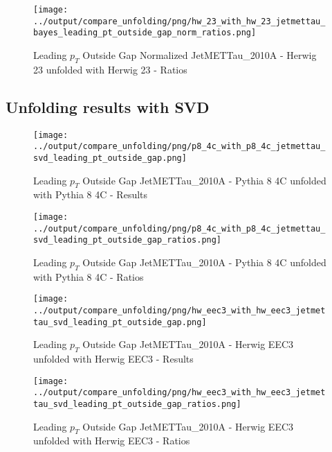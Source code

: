 \documentclass[11pt]{book}
\begin{document}
\begin{figure}[ht]
\centering
\texttt{[image: ../output/compare\_unfolding/png/hw\_23\_with\_hw\_23\_jetmettau\_bayes\_leading\_pt\_outside\_gap\_norm\_ratios.png]}
\caption{Leading $p_{T}$ Outside Gap Normalized JetMETTau\_2010A - Herwig 23 unfolded with Herwig 23 - Ratios}
\label{hw_23_hw_23_jetmettau_bayes_leading_pt_outside_gap_norm_b}
\end{figure}



\clearpage
\subsection{Unfolding results with SVD}

\begin{figure}[ht]
\centering
\texttt{[image: ../output/compare\_unfolding/png/p8\_4c\_with\_p8\_4c\_jetmettau\_svd\_leading\_pt\_outside\_gap.png]}
\caption{Leading $p_{T}$ Outside Gap JetMETTau\_2010A - Pythia 8 4C unfolded with Pythia 8 4C - Results}
\label{p8_p8_jetmettau_svd_leading_pt_outside_gap_a}
\end{figure}

\begin{figure}[ht]
\centering
\texttt{[image: ../output/compare\_unfolding/png/p8\_4c\_with\_p8\_4c\_jetmettau\_svd\_leading\_pt\_outside\_gap\_ratios.png]}
\caption{Leading $p_{T}$ Outside Gap JetMETTau\_2010A - Pythia 8 4C unfolded with Pythia 8 4C - Ratios}
\label{p8_p8_jetmettau_svd_leading_pt_outside_gap_b}
\end{figure}

\begin{figure}[ht]
\centering
\texttt{[image: ../output/compare\_unfolding/png/hw\_eec3\_with\_hw\_eec3\_jetmettau\_svd\_leading\_pt\_outside\_gap.png]}
\caption{Leading $p_{T}$ Outside Gap JetMETTau\_2010A - Herwig EEC3 unfolded with Herwig EEC3 - Results}
\label{hw_eec3_hw_eec3_jetmettau_svd_leading_pt_outside_gap_a}
\end{figure}

\begin{figure}[ht]
\centering
\texttt{[image: ../output/compare\_unfolding/png/hw\_eec3\_with\_hw\_eec3\_jetmettau\_svd\_leading\_pt\_outside\_gap\_ratios.png]}
\caption{Leading $p_{T}$ Outside Gap JetMETTau\_2010A - Herwig EEC3 unfolded with Herwig EEC3 - Ratios}
\label{hw_eec3_hw_eec3_jetmettau_svd_leading_pt_outside_gap_b}
\end{figure}
\end{document}

